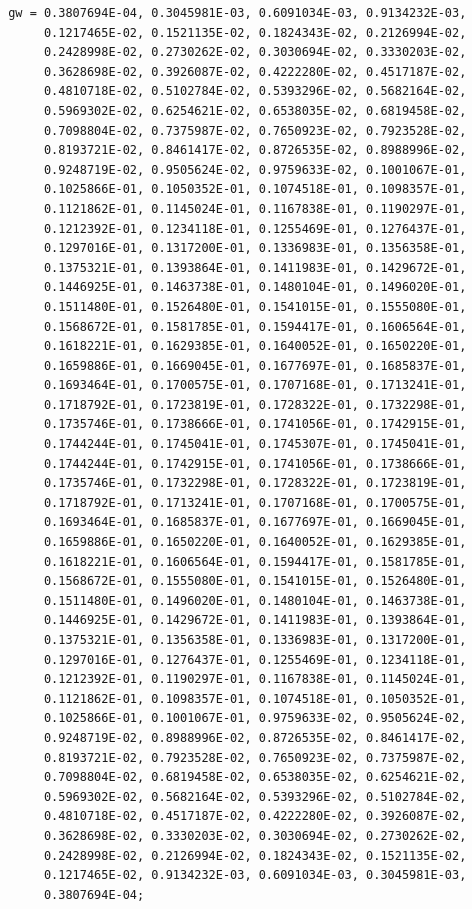 \documentclass[times,doublespace]{fldauth}
\begin{document}
{\begin{appendix}
\begin{verbatim}
 gw = 0.3807694E-04, 0.3045981E-03, 0.6091034E-03, 0.9134232E-03, 
      0.1217465E-02, 0.1521135E-02, 0.1824343E-02, 0.2126994E-02, 
      0.2428998E-02, 0.2730262E-02, 0.3030694E-02, 0.3330203E-02, 
      0.3628698E-02, 0.3926087E-02, 0.4222280E-02, 0.4517187E-02, 
      0.4810718E-02, 0.5102784E-02, 0.5393296E-02, 0.5682164E-02, 
      0.5969302E-02, 0.6254621E-02, 0.6538035E-02, 0.6819458E-02, 
      0.7098804E-02, 0.7375987E-02, 0.7650923E-02, 0.7923528E-02, 
      0.8193721E-02, 0.8461417E-02, 0.8726535E-02, 0.8988996E-02, 
      0.9248719E-02, 0.9505624E-02, 0.9759633E-02, 0.1001067E-01, 
      0.1025866E-01, 0.1050352E-01, 0.1074518E-01, 0.1098357E-01, 
      0.1121862E-01, 0.1145024E-01, 0.1167838E-01, 0.1190297E-01, 
      0.1212392E-01, 0.1234118E-01, 0.1255469E-01, 0.1276437E-01, 
      0.1297016E-01, 0.1317200E-01, 0.1336983E-01, 0.1356358E-01, 
      0.1375321E-01, 0.1393864E-01, 0.1411983E-01, 0.1429672E-01, 
      0.1446925E-01, 0.1463738E-01, 0.1480104E-01, 0.1496020E-01, 
      0.1511480E-01, 0.1526480E-01, 0.1541015E-01, 0.1555080E-01, 
      0.1568672E-01, 0.1581785E-01, 0.1594417E-01, 0.1606564E-01, 
      0.1618221E-01, 0.1629385E-01, 0.1640052E-01, 0.1650220E-01, 
      0.1659886E-01, 0.1669045E-01, 0.1677697E-01, 0.1685837E-01, 
      0.1693464E-01, 0.1700575E-01, 0.1707168E-01, 0.1713241E-01, 
      0.1718792E-01, 0.1723819E-01, 0.1728322E-01, 0.1732298E-01, 
      0.1735746E-01, 0.1738666E-01, 0.1741056E-01, 0.1742915E-01, 
      0.1744244E-01, 0.1745041E-01, 0.1745307E-01, 0.1745041E-01, 
      0.1744244E-01, 0.1742915E-01, 0.1741056E-01, 0.1738666E-01, 
      0.1735746E-01, 0.1732298E-01, 0.1728322E-01, 0.1723819E-01, 
      0.1718792E-01, 0.1713241E-01, 0.1707168E-01, 0.1700575E-01, 
      0.1693464E-01, 0.1685837E-01, 0.1677697E-01, 0.1669045E-01, 
      0.1659886E-01, 0.1650220E-01, 0.1640052E-01, 0.1629385E-01, 
      0.1618221E-01, 0.1606564E-01, 0.1594417E-01, 0.1581785E-01, 
      0.1568672E-01, 0.1555080E-01, 0.1541015E-01, 0.1526480E-01, 
      0.1511480E-01, 0.1496020E-01, 0.1480104E-01, 0.1463738E-01, 
      0.1446925E-01, 0.1429672E-01, 0.1411983E-01, 0.1393864E-01, 
      0.1375321E-01, 0.1356358E-01, 0.1336983E-01, 0.1317200E-01, 
      0.1297016E-01, 0.1276437E-01, 0.1255469E-01, 0.1234118E-01, 
      0.1212392E-01, 0.1190297E-01, 0.1167838E-01, 0.1145024E-01, 
      0.1121862E-01, 0.1098357E-01, 0.1074518E-01, 0.1050352E-01, 
      0.1025866E-01, 0.1001067E-01, 0.9759633E-02, 0.9505624E-02, 
      0.9248719E-02, 0.8988996E-02, 0.8726535E-02, 0.8461417E-02, 
      0.8193721E-02, 0.7923528E-02, 0.7650923E-02, 0.7375987E-02, 
      0.7098804E-02, 0.6819458E-02, 0.6538035E-02, 0.6254621E-02, 
      0.5969302E-02, 0.5682164E-02, 0.5393296E-02, 0.5102784E-02, 
      0.4810718E-02, 0.4517187E-02, 0.4222280E-02, 0.3926087E-02, 
      0.3628698E-02, 0.3330203E-02, 0.3030694E-02, 0.2730262E-02, 
      0.2428998E-02, 0.2126994E-02, 0.1824343E-02, 0.1521135E-02, 
      0.1217465E-02, 0.9134232E-03, 0.6091034E-03, 0.3045981E-03, 
      0.3807694E-04;


\end{verbatim}
\end{appendix}}
\end{document}
